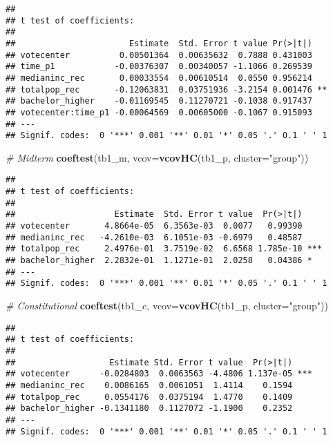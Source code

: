 \documentclass[
]{article}
\newenvironment{Shaded}{\begin{snugshade}}{\end{snugshade}}
\newcommand{\CommentTok}[1]{\textcolor[rgb]{0.56,0.35,0.01}{\textit{#1}}}
\newcommand{\DataTypeTok}[1]{\textcolor[rgb]{0.13,0.29,0.53}{#1}}
\newcommand{\KeywordTok}[1]{\textcolor[rgb]{0.13,0.29,0.53}{\textbf{#1}}}
\newcommand{\NormalTok}[1]{#1}
\newcommand{\StringTok}[1]{\textcolor[rgb]{0.31,0.60,0.02}{#1}}
\begin{document}
\begin{verbatim}
## 
## t test of coefficients:
## 
##                       Estimate  Std. Error t value Pr(>|t|)   
## votecenter          0.00501364  0.00635632  0.7888 0.431003   
## time_p1            -0.00376307  0.00340057 -1.1066 0.269539   
## medianinc_rec       0.00033554  0.00610514  0.0550 0.956214   
## totalpop_rec       -0.12063831  0.03751936 -3.2154 0.001476 **
## bachelor_higher    -0.01169545  0.11270721 -0.1038 0.917437   
## votecenter:time_p1 -0.00064569  0.00605000 -0.1067 0.915093   
## ---
## Signif. codes:  0 '***' 0.001 '**' 0.01 '*' 0.05 '.' 0.1 ' ' 1
\end{verbatim}

\begin{Shaded}
\begin{Highlighting}[]
\CommentTok{# Midterm}
\KeywordTok{coeftest}\NormalTok{(tb1_m, }\DataTypeTok{vcov=}\KeywordTok{vcovHC}\NormalTok{(tb1_p, }\DataTypeTok{cluster=}\StringTok{"group"}\NormalTok{))}
\end{Highlighting}
\end{Shaded}

\begin{verbatim}
## 
## t test of coefficients:
## 
##                    Estimate  Std. Error t value  Pr(>|t|)    
## votecenter       4.8664e-05  6.3563e-03  0.0077   0.99390    
## medianinc_rec   -4.2610e-03  6.1051e-03 -0.6979   0.48587    
## totalpop_rec     2.4976e-01  3.7519e-02  6.6568 1.785e-10 ***
## bachelor_higher  2.2832e-01  1.1271e-01  2.0258   0.04386 *  
## ---
## Signif. codes:  0 '***' 0.001 '**' 0.01 '*' 0.05 '.' 0.1 ' ' 1
\end{verbatim}

\begin{Shaded}
\begin{Highlighting}[]
\CommentTok{# Constitutional}
\KeywordTok{coeftest}\NormalTok{(tb1_c, }\DataTypeTok{vcov=}\KeywordTok{vcovHC}\NormalTok{(tb1_p, }\DataTypeTok{cluster=}\StringTok{"group"}\NormalTok{))}
\end{Highlighting}
\end{Shaded}

\begin{verbatim}
## 
## t test of coefficients:
## 
##                   Estimate Std. Error t value  Pr(>|t|)    
## votecenter      -0.0284803  0.0063563 -4.4806 1.137e-05 ***
## medianinc_rec    0.0086165  0.0061051  1.4114    0.1594    
## totalpop_rec     0.0554176  0.0375194  1.4770    0.1409    
## bachelor_higher -0.1341180  0.1127072 -1.1900    0.2352    
## ---
## Signif. codes:  0 '***' 0.001 '**' 0.01 '*' 0.05 '.' 0.1 ' ' 1
\end{verbatim}
\end{document}
